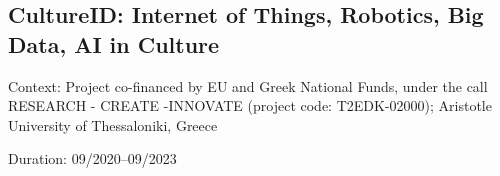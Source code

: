 \subsection{CultureID: Internet of Things, Robotics, Big Data, AI in Culture}

Context: Project co-financed by EU and Greek National Funds, under the call RESEARCH - CREATE -INNOVATE (project code: T2EDK-02000); Aristotle University of Thessaloniki, Greece

\noindent Duration: 09/2020--09/2023
